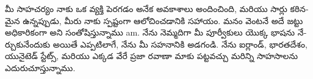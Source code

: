 \documentclass[12pt,varwidth]{standalone}
\begin{document}


\begin{telugu} 

మీ సాహచర్యం నాకు ఒక వ్యక్తి పెరగడం అనేక అవకాశాలు అందించింది, మరియు సార్లు కఠినమైన ఉన్నప్పుడు, మీరు నాకు స్పష్టంగా ఆలోచించడానికి సహాయం. మనం వెంటనే అదే జట్టు అధికారికంగా అని సంతోషిస్తున్నాము am. నేను నెమ్మదిగా మీ పూర్వీకులు యొక్క భాషను నేర్చుకునేందుకు అయితే ఎప్పటిలాగే, నేను మీ సహనానికి అడగండి. నేను ఐర్లాండ్, భారతదేశం, యునైటెడ్ స్టేట్స్, మరియు ఎక్కడ వేరే ప్రజా రవాణా మాకు పట్టవచ్చు మరిన్ని సాహసాలను ఎదురుచూస్తున్నాము.

\end{telugu}
\end{document}
